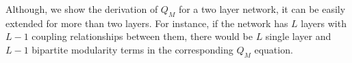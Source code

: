 Although, we show the derivation of $Q_M$ for a two layer network, it can be easily extended for more
than two layers. For instance, if the network has $L$ layers with $L-1$ coupling relationships between them, there would be
$L$ single layer and $L-1$ bipartite modularity terms in the corresponding $Q_M$ equation.
